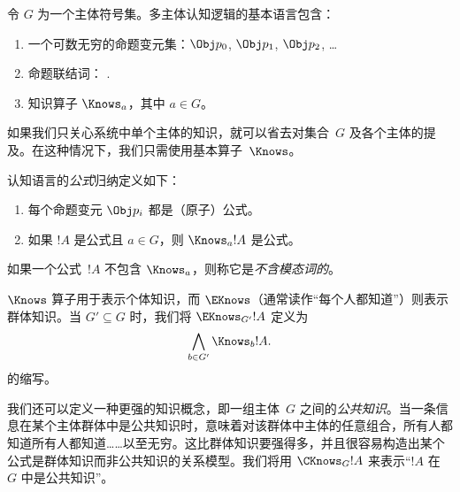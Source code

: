\documentclass[../../../include/open-logic-section]{subfiles}
\begin{document}


\begin{defn}
令 $G$ 为一个主体符号集。多主体认知逻辑的基本语言包含：
\begin{enumerate}
  \item 一个可数无穷的命题变元集：$\Obj p_0$, $\Obj p_1$, $\Obj p_2$, \dots
  \item 命题联结词：\startycommalist
  .
  \item 知识算子 $\Knows_a$，其中 $a \in G$。
\end{enumerate}
\end{defn}

如果我们只关心系统中单个主体的知识，就可以省去对集合~$G$ 及各个主体的提及。在这种情况下，我们只需使用基本算子~$\Knows$。

\begin{defn}
认知语言的\emph{公式}归纳定义如下：
\begin{enumerate}


\item 每个命题变元 $\Obj p_i$ 都是（原子）公式。






\item 如果 $!A$ 是公式且 $a \in G$，则 $\Knows_a !A$ 是公式。

\end{enumerate}
\end{defn}

如果一个公式~$!A$ 不包含 $\Knows_a$，则称它是\emph{不含模态词的}。

\begin{defn}
  $\Knows$ 算子用于表示个体知识，而 $\EKnows$（通常读作“每个人都知道”）则表示群体知识。当 $G' \subseteq G$ 时，我们将 $\EKnows_{G'} !A$ 定义为 \[\bigwedge_{b \in G'} \Knows_b !A.\] 的缩写。
\end{defn}

我们还可以定义一种更强的知识概念，即一组主体~$G$ 之间的\emph{公共知识}。当一条信息在某个主体群体中是公共知识时，意味着对该群体中主体的任意组合，所有人都知道所有人都知道……以至无穷。这比群体知识要强得多，并且很容易构造出某个公式是群体知识而非公共知识的关系模型。我们将用 $\CKnows_G !A$ 来表示“$!A$ 在~$G$ 中是公共知识”。
\end{document}
